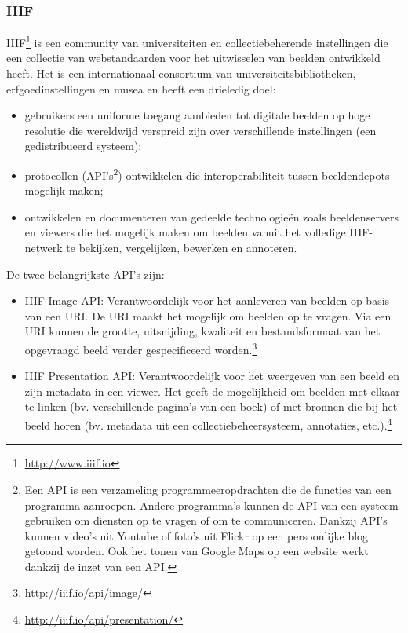 \documentclass[fleqn,10pt]{voorstel}
\begin{document}
\subsubsection{IIIF}
IIIF\footnote{\href{http://www.iiif.io}{http://www.iiif.io}} is een community van universiteiten en collectiebeherende instellingen die een collectie van webstandaarden voor het uitwisselen van beelden ontwikkeld heeft. Het is een internationaal consortium van universiteitsbibliotheken, erfgoedinstellingen en musea en heeft een drieledig doel:
\begin{itemize}
	\item gebruikers een uniforme toegang aanbieden tot digitale beelden op hoge resolutie die wereldwijd verspreid zijn over verschillende instellingen (een gedistribueerd systeem);
	\item protocollen (API's\footnote{Een API is een verzameling programmeeropdrachten die de functies van een programma aanroepen. Andere programma's kunnen de API van een systeem gebruiken om diensten op te vragen of om te communiceren. Dankzij API's kunnen video's uit Youtube of foto's uit Flickr op een persoonlijke blog getoond worden. Ook het tonen van Google Maps op een website werkt dankzij de inzet van een API.}) ontwikkelen die interoperabiliteit tussen beeldendepots mogelijk maken;
	\item ontwikkelen en documenteren van gedeelde technologieën zoals beeldenservers en viewers die het mogelijk maken om beelden vanuit het volledige IIIF-netwerk te bekijken, vergelijken, bewerken en annoteren.
\end{itemize}
De twee belangrijkste API's zijn:
\begin{itemize}
	\item IIIF Image API: Verantwoordelijk voor het aanleveren van beelden op basis van een URI. De URI maakt het mogelijk om beelden op te vragen. Via een URI kunnen de grootte, uitsnijding, kwaliteit en bestandsformaat van het opgevraagd beeld verder gespecificeerd worden.\footnote{\href{http://iiif.io/api/image/}{http://iiif.io/api/image/}}
	\item IIIF Presentation API: Verantwoordelijk voor het weergeven van een beeld en zijn metadata in een viewer. Het geeft de mogelijkheid om beelden met elkaar te linken (bv. verschillende pagina’s van een boek) of met bronnen die bij het beeld horen (bv. metadata uit een collectiebeheersysteem, annotaties, etc.).\footnote{\href{http://iiif.io/api/presentation/}{http://iiif.io/api/presentation/}}
\end{itemize}
\end{document}
